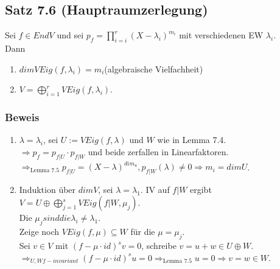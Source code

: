 \documentclass[a4paper, 12pt]{extarticle}
\begin{document}
\subsection*{Satz 7.6 (Hauptraumzerlegung)}
Sei $f \in EndV$ und sei $p_f = \prod_{i=i}^{r}(X-\lambda_i)^{m_i}$ mit verschiedenen EW $\lambda_i$.\\
Dann \begin{enumerate}[label=(\alph*)]
	\item $dim VEig(f,\lambda_i) = m_i$(algebraische Vielfachheit)
	\item $V = \bigoplus_{i=1}^{r} VEig(f, \lambda_i)$.
\end{enumerate}
\subsubsection*{Beweis}
\begin{enumerate}[label=(\alph*)]
	\item $\lambda = \lambda_i$, sei $U := VEig(f,\lambda)$ und $W$ wie in Lemma 7.4.\\
	$\Rightarrow p_f = p_{f|U}\cdot p_{f|W}$ und beide zerfallen in Linearfaktoren.\\
	$\Rightarrow_{\text{Lemma 7.5}} p_{f|U} = (X-\lambda)^{dim_u}, p_{f|W}(\lambda) \neq 0 \Rightarrow m_i = dimU$.\\
	\item  Induktion über $dimV$, sei $\lambda = \lambda_1$.
	IV auf $f|W$ ergibt $V = U \oplus \bigoplus_{j = 1}^{s} VEig(f|W, \mu_j)$.\\
	Die $\mu_j sind die \lambda_i \neq \lambda_1$.\\
	Zeige noch $VEig(f,\mu) \subseteq W$ für die $\mu = \mu_j$.\\
	Sei $v \in V$ mit $(f-\mu \cdot id)^sv = 0$, schreibe $v = u + w \in U \oplus W$.\\
	$\Rightarrow_{U, W f-invariant} (f- \mu \cdot  id)^su = 0 \Rightarrow_{\text{Lemma 7.5}} u = 0 \Rightarrow v = w \in W$.
\end{enumerate}
\end{document}
